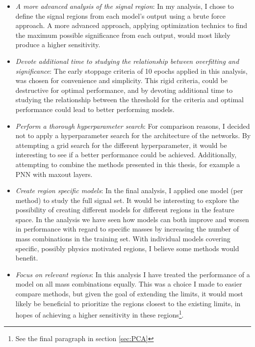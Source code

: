 \begin{itemize}
    \item \emph{A more advanced analysis of the signal region}: In my analysis, I chose to define the signal regions from each model's output using a brute force approach. 
          A more advanced approach, applying optimization technics to find the maximum possible significance from each output, would most likely produce a higher sensitivity.
    \item \emph{Devote additional time to studying the relationship between overfitting and significance}: The early stoppage criteria of 10 epochs applied in this analysis, was chosen 
          for convenience and simplicity. This rigid criteria, could be destructive for optimal performance, and by devoting additional time to studying
          the relationship between the threshold for the criteria and optimal performance could lead to better performing models.
    \item \emph{Perform a thorough hyperparameter search}: For comparison reasons, I decided not to apply a hyperparameter search for the architecture of the networks. By attempting 
           a grid search for the different hyperparameter, it would be interesting to see if a better performance could be achieved. Additionally, attempting to combine the methods presented 
           in this thesis, for example a \ac{PNN} with maxout layers. 
    \item \emph{Create region specific models}: In the final analysis, I applied one model (per method) to study the full signal set. It would be interesting to explore the possibility of creating
          different models for different regions in the feature space. In the analysis we have seen how models can both improve and worsen in performance with regard to specific masses by increasing
          the number of mass combinations in the training set. With individual models covering specific, possibly physics motivated regions, I believe some methods would benefit.
    \item \emph{Focus on relevant regions}: In this analysis I have treated the performance of a model on all mass combinations equally. This was a choice I made to easier compare methods, but 
          given the goal of extending the limits, it would most likely be beneficial to prioritize the regions closest to the existing limits, in hopes of achieving a higher sensitivity in these 
          regions\footnote{See the final paragraph in section \ref{sec:PCA}}.  
\end{itemize}

